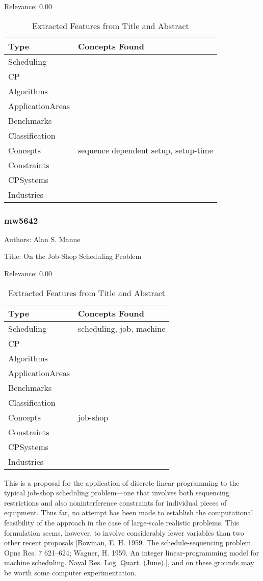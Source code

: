 Relevance:  0.00

{\scriptsize
\begin{longtable}{p{2cm}p{20cm}}
\caption{Extracted Features from Title and Abstract}\\ \toprule
Type & Concepts Found\\ \midrule
\endhead
\bottomrule
\endfoot
Scheduling & \\ 
CP & \\ 
Algorithms & \\ 
ApplicationAreas & \\ 
Benchmarks & \\ 
Classification & \\ 
Concepts & sequence dependent setup, setup-time\\ 
Constraints & \\ 
CPSystems & \\ 
Industries & \\ 
\end{longtable}
}



\subsubsection{mw5642}
\label{mw:mw5642}

Authors: Alan S. Manne

Title: On the Job-Shop Scheduling Problem

Relevance:  0.00

{\scriptsize
\begin{longtable}{p{2cm}p{20cm}}
\caption{Extracted Features from Title and Abstract}\\ \toprule
Type & Concepts Found\\ \midrule
\endhead
\bottomrule
\endfoot
Scheduling & scheduling, job, machine\\ 
CP & \\ 
Algorithms & \\ 
ApplicationAreas & \\ 
Benchmarks & \\ 
Classification & \\ 
Concepts & job-shop\\ 
Constraints & \\ 
CPSystems & \\ 
Industries & \\ 
\end{longtable}
}

  This is a proposal for the application of discrete linear programming to the typical job-shop scheduling problem—one that involves both sequencing restrictions and also noninterference constraints for individual pieces of equipment. Thus far, no attempt has been made to establish the computational feasibility of the approach in the case of large-scale realistic problems. This formulation seems, however, to involve considerably fewer variables than two other recent proposals [Bowman, E. H. 1959. The schedule-sequencing problem. Opns Res. 7 621–624; Wagner, H. 1959. An integer linear-programming model for machine scheduling. Naval Res. Log. Quart. (June).], and on these grounds may be worth some computer experimentation.  

